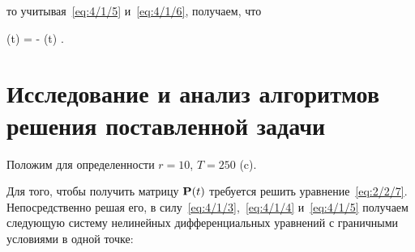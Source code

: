 то учитывая~\ref{eq:4/1/5} и~\ref{eq:4/1/6}, получаем, что

	\optU(t) = -  (t) \mbox{.}
\eeq



\section{Исследование и анализ алгоритмов решения поставленной задачи}



Положим для определенности $r = 10$, $T = 250$ (c).

Для того, чтобы получить матрицу $\mathbf{P}(t)$ требуется решить уравнение~\vref{eq:2/2/7}. Непосредственно решая его, в силу~\ref{eq:4/1/3},~\ref{eq:4/1/4} и~\ref{eq:4/1/5} получаем следующую систему нелинейных дифференциальных уравнений с граничными условиями в одной точке:

\eeq

